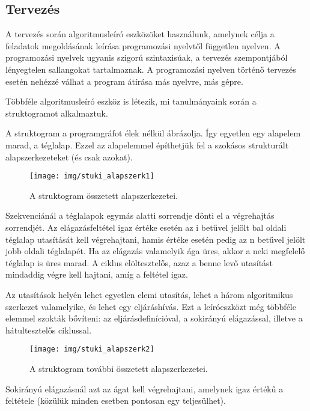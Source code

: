 \documentclass[margin=0px]{article}
\begin{document}
\subsection{Tervezés}

A tervezés során algoritmusleíró eszközöket használunk, amelynek célja a feladatok megoldásának leírása programozási nyelvtől független nyelven. A programozási nyelvek ugyanis szigorú szintaxisúak, a tervezés szempontjából lényegtelen sallangokat tartalmaznak. A programozási nyelven történő tervezés esetén nehézzé válhat a program átírása más nyelvre, más gépre.

Többféle algoritmusleíró eszköz is létezik, mi tanulmányaink során a struktogramot alkalmaztuk.

A struktogram a programgráfot élek nélkül ábrázolja. Így egyetlen egy alapelem marad, a téglalap. Ezzel az alapelemmel építhetjük fel a szokásos strukturált alapszerkezeteket (és csak azokat).

\begin{figure}[H]
    \centering
    \texttt{[image: img/stuki\_alapszerk1]}
    \caption{A struktogram összetett alapszerkezetei.}
    \label{fig:stuki_alapszerk1}
\end{figure}

Szekvenciánál a téglalapok egymás alatti sorrendje dönti el a végrehajtás sorrendjét. Az elágazásfeltétel igaz értéke esetén az i betűvel jelölt bal oldali téglalap utasítását kell végrehajtani, hamis értéke esetén pedig az n betűvel jelölt jobb oldali téglalapét. Ha az elágazás valamelyik ága üres, akkor a neki megfelelő téglalap is üres marad. A ciklus elöltesztelős, azaz a benne levő utasítást mindaddig végre kell hajtani, amíg a feltétel igaz.

Az utasítások helyén lehet egyetlen elemi utasítás, lehet a három algoritmikus szerkezet valamelyike, és lehet egy eljáráshívás. Ezt a leíróeszközt még többféle elemmel szokták bővíteni: az eljárásdefinícióval, a sokirányú elágazással, illetve a hátultesztelős ciklussal.

\begin{figure}[H]
    \centering
    \texttt{[image: img/stuki\_alapszerk2]}
    \caption{A struktogram további összetett alapszerkezetei.}
    \label{fig:stuki_alapszerk2}
\end{figure}

\noindent Sokirányú elágazásnál azt az ágat kell végrehajtani, amelynek igaz értékű a feltétele (közülük minden esetben pontosan egy teljesülhet).\\
\end{document}

